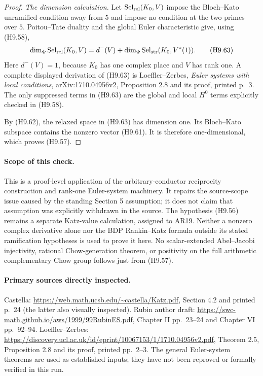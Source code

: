 \begin{proof}
\emph{The dimension calculation.}
Let $\operatorname{Sel}_{\rm rel}(K_0,V)$ impose the Bloch--Kato
unramified condition away from $5$ and impose no condition at the
two primes over $5$. Poitou--Tate duality and the global Euler
characteristic give, using (H9.58),
\[
 \dim_\Phi\operatorname{Sel}_{\rm rel}(K_0,V)
    =d^-(V)+
       \dim_\Phi\operatorname{Sel}_{\rm str}(K_0,V^*(1)).    \tag{H9.63}
\]
Here $d^-(V)=1$, because $K_0$ has one complex place and $V$ has
rank one. A complete displayed derivation of (H9.63) is
Loeffler--Zerbes, \emph{Euler systems with local conditions},
arXiv:1710.04956v2, Proposition 2.8 and its proof, printed p.~3.
The only suppressed terms in (H9.63) are the global and local
$H^0$ terms explicitly checked in (H9.58).

By (H9.62), the relaxed space in (H9.63) has dimension one.
Its Bloch--Kato subspace contains the nonzero vector (H9.61).
It is therefore one-dimensional, which proves (H9.57).
\end{proof}

\paragraph{Scope of this check.}
This is a proof-level application of the arbitrary-conductor
reciprocity construction and rank-one Euler-system machinery.
It repairs the source-scope issue caused by the standing
Section 5 assumption; it does not claim that assumption was
explicitly withdrawn in the source. The hypothesis (H9.56)
remains a separate Katz-value calculation, assigned to AR19.
Neither a nonzero complex derivative alone nor the BDP
Rankin--Katz formula outside its stated ramification hypotheses
is used to prove it here. No scalar-extended Abel--Jacobi
injectivity, rational Chow-generation theorem, or positivity on
the full arithmetic complementary Chow group follows just from
(H9.57).

\paragraph{Primary sources directly inspected.}
Castella: \url{https://web.math.ucsb.edu/~castella/Katz.pdf},
Section 4.2 and printed p.~24 (the latter also visually inspected).
Rubin author draft:
\url{https://swc-math.github.io/aws/1999/99RubinES.pdf},
Chapter II pp.~23--24 and Chapter VI pp.~92--94.
Loeffler--Zerbes:
\url{https://discovery.ucl.ac.uk/id/eprint/10067153/1/1710.04956v2.pdf},
Theorem 2.5, Proposition 2.8 and its proof, printed pp.~2--3.
The general Euler-system theorems are used as established inputs;
they have not been reproved or formally verified in this run.
